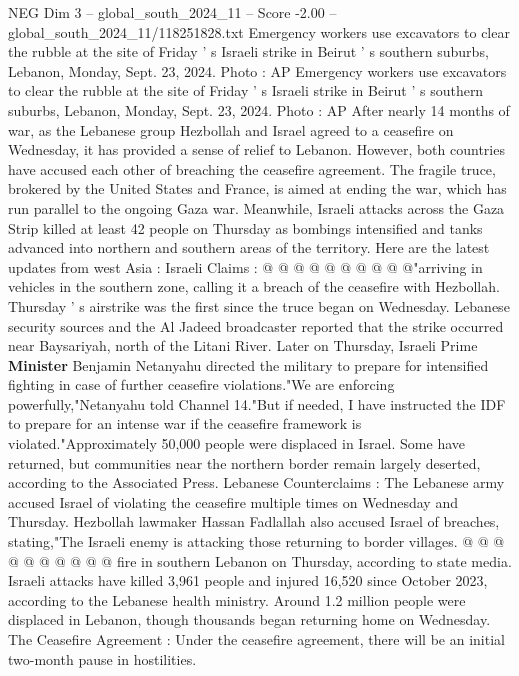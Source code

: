 \begin{textsample}{NEG Dim 3 – global\_south\_2024\_11 – Score -2.00 – global\_south\_2024\_11/118251828.txt}  \label{ex:f3_neg_132}
Emergency workers use excavators to clear the rubble at the site of Friday ' s Israeli strike in Beirut ' s southern suburbs, Lebanon, Monday, Sept. 23, 2024.
Photo : AP Emergency workers use excavators to clear the rubble at the site of Friday ' s Israeli strike in Beirut ' s southern suburbs, Lebanon, Monday, Sept. 23, 2024.
Photo : AP After nearly 14 months of war, as the Lebanese group Hezbollah and Israel agreed to a ceasefire on Wednesday, it has provided a sense of relief to Lebanon.
However, both countries have accused each other of breaching the ceasefire agreement.
The fragile truce, brokered by the United States and France, is aimed at ending the war, which has run parallel to the ongoing Gaza war.
Meanwhile, Israeli attacks across the Gaza Strip killed at least 42 people on Thursday as bombings intensified and tanks advanced into northern and southern areas of the territory.
Here are the latest updates from west Asia : Israeli Claims : @ @ @ @ @ @ @ @ @ @"arriving in vehicles in the southern zone, calling it a breach of the ceasefire with Hezbollah.
Thursday ' s airstrike was the first since the truce began on Wednesday.
Lebanese security sources and the Al Jadeed broadcaster reported that the strike occurred near Baysariyah, north of the Litani River.
Later on Thursday, Israeli Prime \textbf{Minister} Benjamin Netanyahu directed the military to prepare for intensified fighting in case of further ceasefire violations."We are enforcing powerfully,"Netanyahu told Channel 14."But if needed, I have instructed the IDF to prepare for an intense war if the ceasefire framework is violated."Approximately 50,000 people were displaced in Israel.
Some have returned, but communities near the northern border remain largely deserted, according to the Associated Press.
Lebanese Counterclaims : The Lebanese army accused Israel of violating the ceasefire multiple times on Wednesday and Thursday.
Hezbollah lawmaker Hassan Fadlallah also accused Israel of breaches, stating,"The Israeli enemy is attacking those returning to border villages. @ @ @ @ @ @ @ @ @ @ fire in southern Lebanon on Thursday, according to state media.
Israeli attacks have killed 3,961 people and injured 16,520 since October 2023, according to the Lebanese health ministry.
Around 1.2 million people were displaced in Lebanon, though thousands began returning home on Wednesday.
The Ceasefire Agreement : Under the ceasefire agreement, there will be an initial two-month pause in hostilities.

\end{textsample}
